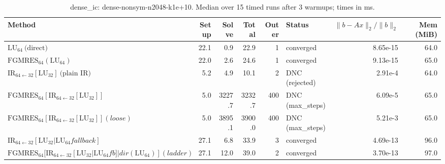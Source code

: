 \begin{table}[t]
\centering
\small
\caption{dense_ic: dense-nonsym-n2048-k1e+10. Median over 15 timed runs after 3 warmups; times in ms.}
\label{tab:dense_ic-dense-nonsym-n2048-k1e+10}
\begin{tabular}{lrrrrlrr}
\hline
Method & Setup & Solve & Total & Outer & Status & $\|b-Ax\|_2/\|b\|_2$ & Mem (MiB) \\
\hline
$\mathrm{LU}_{64}\ \text{(direct)}$ & 22.1 & 0.9 & 22.9 & 1 & converged & 8.65e-15 & 64.0 \\
$\mathrm{FGMRES}_{64}(\mathrm{LU}_{64})$ & 22.0 & 2.6 & 24.6 & 1 & converged & 9.13e-15 & 65.0 \\
$\mathrm{IR}_{64\leftarrow 32}[\mathrm{LU}_{32}]\ \text{(plain IR)}$ & 5.2 & 4.9 & 10.1 & 2 & DNC (rejected) & 2.91e-4 & 64.0 \\
$\mathrm{FGMRES}_{64}[\mathrm{IR}_{64\leftarrow 32}[\mathrm{LU}_{32}]]$ & 5.0 & 3227.7 & 3232.7 & 400 & DNC (max_steps) & 6.09e-5 & 65.0 \\
$\mathrm{FGMRES}_{64}[\mathrm{IR}_{64\leftarrow 32}[\mathrm{LU}_{32}]] (loose)$ & 5.0 & 3895.1 & 3900.0 & 400 & DNC (max_steps) & 5.21e-3 & 65.0 \\
$\mathrm{IR}_{64\leftarrow 32}[\mathrm{LU}_{32} | \mathrm{LU}_{64} fallback]$ & 27.1 & 6.8 & 33.9 & 3 & converged & 4.69e-13 & 96.0 \\
$\mathrm{FGMRES}_{64}[\mathrm{IR}_{64\leftarrow 32}[\mathrm{LU}_{32}|\mathrm{LU}_{64} fb]|dir(\mathrm{LU}_{64})] (ladder)$ & 27.1 & 12.0 & 39.0 & 2 & converged & 3.70e-13 & 97.0 \\
\hline
\end{tabular}
\end{table}
